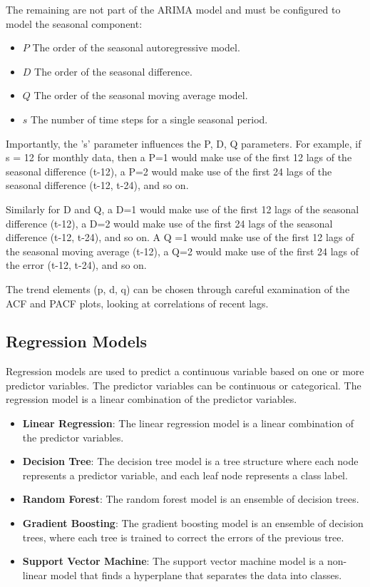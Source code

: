 \documentclass[manuscript,screen,nonacm]{acmart}
\numberwithin{equation}{section}
\begin{document}
The remaining are not part of the ARIMA model and must be configured to
model the seasonal component:
\begin{itemize}
\item $P$ The order of the seasonal autoregressive model.
\item $D$ The order of the seasonal difference.
\item $Q$ The order of the seasonal moving average model.
\item $s$ The number of time steps for a single seasonal period.
\end{itemize}

Importantly, the 's' parameter influences the P, D, Q parameters. 
For example, if s = 12 for monthly data, then a P=1 would make use of 
the first 12 lags of the seasonal difference (t-12), a P=2 would make 
use of the first 24 lags of the seasonal difference (t-12, t-24), and so on.

Similarly for D and Q, a D=1 would make use of the first 12 lags of 
the seasonal difference (t-12), a D=2 would make use of the first 24
lags of the seasonal difference (t-12, t-24), and so on. 
A Q =1 would make use of the first 12 lags of the seasonal moving 
average (t-12), a Q=2 would make use of the first 24 lags of the error
(t-12, t-24), and so on.

The trend elements (p, d, q) can be chosen through careful examination 
of the ACF and PACF plots, looking at correlations of recent lags.


\subsection{Regression Models}
Regression models are used to predict a continuous variable based on one or more predictor variables. The predictor variables can be continuous or categorical. The regression model is a linear combination of the predictor variables.

\begin {itemize}
\item \textbf{Linear Regression}: The linear regression model is a linear combination of the predictor variables.
\item \textbf{Decision Tree}: The decision tree model is a tree structure where each node represents a predictor variable, and each leaf node represents a class label.
\item \textbf{Random Forest}: The random forest model is an ensemble of decision trees.
\item \textbf{Gradient Boosting}: The gradient boosting model is an ensemble of decision trees, where each tree is trained to correct the errors of the previous tree.
\item \textbf{Support Vector Machine}: The support vector machine model is a non-linear model that finds a hyperplane that separates the data into classes.

\end{itemize}
\end{document}
